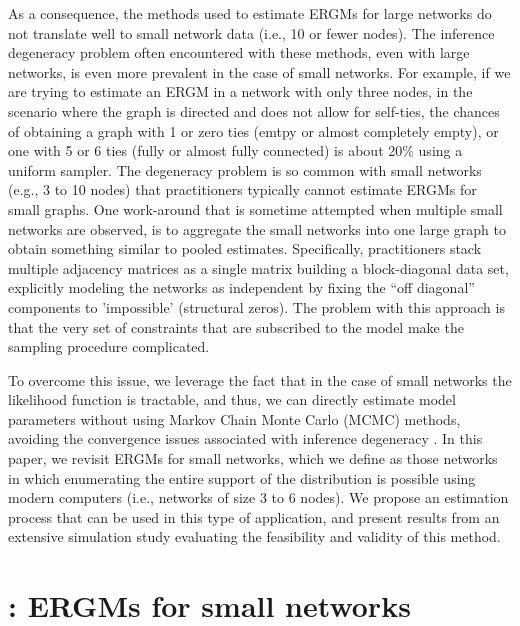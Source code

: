 \documentclass[12pt]{article}
\begin{document}
As a consequence, the methods used to estimate ERGMs for large networks do not translate well to small network data (i.e., 10 or fewer nodes). The inference degeneracy problem \cite{Handcock2003} often encountered with these methods, even with large networks, is even more prevalent in the case of small networks. For example, if we are trying to estimate an ERGM in a network with only three nodes, in the scenario where the graph is directed and does not allow for self-ties, the chances of obtaining a graph with 1 or zero ties (emtpy or almost completely empty), or one with 5 or 6 ties (fully or almost fully connected) is about 20\% using a uniform sampler. The degeneracy problem is so common with small networks (e.g., 3 to 10 nodes) that practitioners typically cannot estimate ERGMs for small graphs. One work-around that is sometime attempted when multiple small networks are observed, is to aggregate the small networks into one large graph to obtain something similar to pooled estimates. Specifically, practitioners stack multiple adjacency matrices as a single matrix  building a block-diagonal data set, explicitly modeling the networks as independent by fixing the ``off diagonal'' components to 'impossible' (structural zeros). The problem with this approach is that the very set of constraints that are subscribed to the model make the sampling procedure complicated. 

To overcome this issue, we leverage the fact that in the case of small networks the likelihood function is tractable, and thus, we can directly estimate model parameters without using Markov Chain Monte Carlo (MCMC) methods, avoiding the convergence issues associated with inference degeneracy \cite{Handcock2003}. In this paper, we revisit ERGMs for small networks, which we define as those networks in which enumerating the entire support of the distribution is possible using modern computers (i.e., networks of size 3 to 6 nodes). We propose an estimation process that can be used in this type of application, and present results from an extensive simulation study evaluating the feasibility and validity of this method.

\section{\ergmitos{}: ERGMs for small networks}
\end{document}
